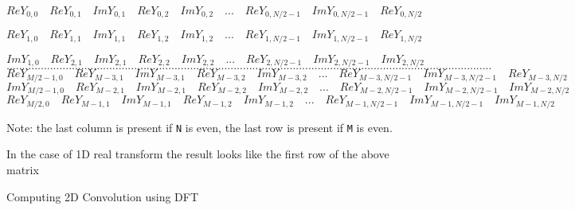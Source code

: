 \[Re Y_{0,0} \quad     Re Y_{0,1}  \quad  Im Y_{0,1}  \quad  Re Y_{0,2}     \quad Im Y_{0,2} \quad ...  \quad Re Y_{0,N/2-1} \quad  Im Y_{0,N/2-1} \quad Re Y_{0,N/2}\]

\[Re Y_{1,0}  \quad    Re Y_{1,1}  \quad  Im Y_{1,1}   \quad Re Y_{1,2}   \quad  Im Y_{1,2} \quad ... \quad Re Y_{1,N/2-1}  \quad Im Y_{1,N/2-1} \quad Re Y_{1,N/2}\]

\[Im Y_{1,0}    \quad  Re Y_{2,1}  \quad  Im Y_{2,1} \quad   Re Y_{2,2}  \quad   Im Y_{2,2} \quad ... \quad Re Y_{2,N/2-1}  \quad Im Y_{2,N/2-1} \quad Im Y_{2,N/2}\]
\[............................................................................................................................................................\]
\[Re Y_{M/2-1,0} \quad  Re Y_{M-3,1}  \quad Im Y_{M-3,1} \quad Re Y_{M-3,2} \quad  Im Y_{M-3,2} \quad... \quad Re Y_{M-3,N/2-1} \quad Im Y_{M-3,N/2-1}\quad Re Y_{M-3,N/2}\]
\[Im Y_{M/2-1,0} \quad  Re Y_{M-2,1}  \quad Im Y_{M-2,1} \quad Re Y_{M-2,2} \quad  Im Y_{M-2,2} \quad... \quad Re Y_{M-2,N/2-1} \quad Im Y_{M-2,N/2-1}\quad Im Y_{M-2,N/2}\]
\[Re Y_{M/2,0}  \quad  Re Y_{M-1,1} \quad  Im Y_{M-1,1} \quad Re Y_{M-1,2} \quad  Im Y_{M-1,2} \quad ... \quad Re Y_{M-1,N/2-1} \quad Im Y_{M-1,N/2-1}\quad Im Y_{M-1,N/2}\]


Note: the last column is present if \texttt{N} is even, the last row is present if \texttt{M} is even.

In the case of 1D real transform the result looks like the first row of the above matrix

Computing 2D Convolution using DFT

